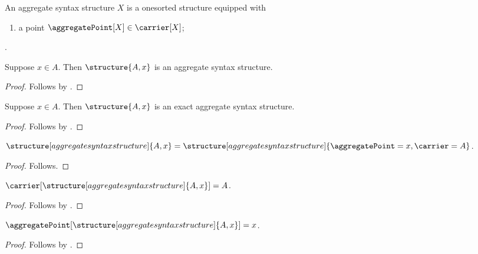 \begin{struct}\label{aggregate_syntax_structure}
    An aggregate syntax structure $X$ is a onesorted structure equipped with
    \begin{enumerate}
        \item\label{aggregate_syntax_point}
            a point $\aggregatePoint[X]\in\carrier[X]$;
    \end{enumerate}
    .
\end{struct}

\begin{proposition}\label{aggregate_syntax_contextual}
    Suppose $x\in A$.
    Then $\structure{A,x}$ is an aggregate syntax structure.
\end{proposition}
\begin{proof}
    Follows by
    .
\end{proof}

\begin{proposition}\label{aggregate_syntax_contextual_exact}
    Suppose $x\in A$.
    Then $\structure{A,x}$ is an exact aggregate syntax structure.
\end{proposition}
\begin{proof}
    Follows by
    .
\end{proof}

\begin{proposition}\label{aggregate_syntax_named}
    $\structure[aggregate syntax structure]{A,x}
        =\structure[aggregate syntax structure]{
            \aggregatePoint=x,
            \carrier=A
        }$.
\end{proposition}
\begin{proof}
    Follows.
\end{proof}

\begin{proposition}\label{aggregate_syntax_carrier}
    $\carrier[\structure[aggregate syntax structure]{A,x}]=A$.
\end{proposition}
\begin{proof}
    Follows by .
\end{proof}

\begin{proposition}\label{aggregate_syntax_point_value}
    $\aggregatePoint[\structure[aggregate syntax structure]{A,x}]=x$.
\end{proposition}
\begin{proof}
    Follows by .
\end{proof}
